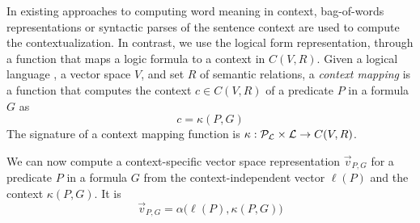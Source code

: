 

In existing approaches to computing word meaning in context,
bag-of-words representations or syntactic parses of the sentence
context are used to compute the contextualization. In contrast, we
use the logical form representation, through a function that maps a
logic formula to a context in $C(V, R)$.  Given a logical language \loglang, a vector space
$V$, and set $R$ of semantic relations, a \textit{context mapping} is
a function that computes the context $c \in C(V, R)$ of a predicate $P$ in a formula
$G$ as 
\[c = \kappa(P, G)\]
The signature of a context mapping function is $\kappa:
{\cal{P}}_{{\cal{L}}} \times {\cal{L}} \to C(V, R)$. 

We can now compute a context-specific vector space representation
$\vec{v}_{P, G}$ for
a predicate $P$ in a formula $G$ from the context-independent vector
$\ell(P)$ and the context $\kappa(P, G)$. It is 
\[\vec{v}_{P, G} = \alpha\big(\ell(P), \kappa(P, G)\big)\]

